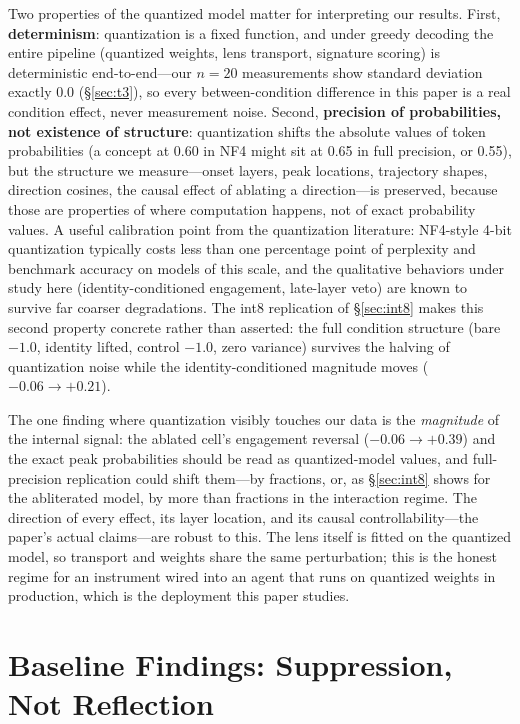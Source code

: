 \documentclass[11pt,a4paper]{article}
\begin{document}
Two properties of the quantized model matter for interpreting our results. First, \textbf{determinism}: quantization is a fixed function, and under greedy decoding the entire pipeline (quantized weights, lens transport, signature scoring) is deterministic end-to-end---our $n=20$ measurements show standard deviation exactly 0.0 (\S\ref{sec:t3}), so every between-condition difference in this paper is a real condition effect, never measurement noise. Second, \textbf{precision of probabilities, not existence of structure}: quantization shifts the absolute values of token probabilities (a concept at 0.60 in NF4 might sit at 0.65 in full precision, or 0.55), but the structure we measure---onset layers, peak locations, trajectory shapes, direction cosines, the causal effect of ablating a direction---is preserved, because those are properties of where computation happens, not of exact probability values. A useful calibration point from the quantization literature: NF4-style 4-bit quantization typically costs less than one percentage point of perplexity and benchmark accuracy on models of this scale, and the qualitative behaviors under study here (identity-conditioned engagement, late-layer veto) are known to survive far coarser degradations. The int8 replication of \S\ref{sec:int8} makes this second property concrete rather than asserted: the full condition structure (bare $-1.0$, identity lifted, control $-1.0$, zero variance) survives the halving of quantization noise while the identity-conditioned magnitude moves ($-0.06 \to +0.21$).

The one finding where quantization visibly touches our data is the \emph{magnitude} of the internal signal: the ablated cell's engagement reversal ($-0.06 \to +0.39$) and the exact peak probabilities should be read as quantized-model values, and full-precision replication could shift them---by fractions, or, as \S\ref{sec:int8} shows for the abliterated model, by more than fractions in the interaction regime. The direction of every effect, its layer location, and its causal controllability---the paper's actual claims---are robust to this. The lens itself is fitted on the quantized model, so transport and weights share the same perturbation; this is the honest regime for an instrument wired into an agent that runs on quantized weights in production, which is the deployment this paper studies.

\section{Baseline Findings: Suppression, Not Reflection}
\end{document}
